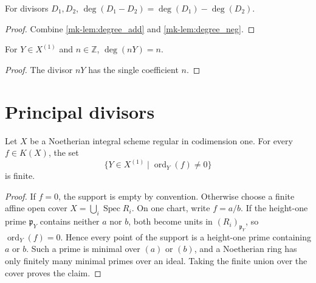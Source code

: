 \begin{lemma}
  \label{mk-lem:degree_sub}
  \leanok

  For divisors \(D_1,D_2\),
  \(\deg(D_1-D_2)=\deg(D_1)-\deg(D_2)\).
\end{lemma}
\begin{proof}
  \leanok
  Combine \ref{mk-lem:degree_add} and \ref{mk-lem:degree_neg}.
\end{proof}

\begin{lemma}
  \label{mk-lem:degree_single}
  \leanok

  For \(Y\in X^{(1)}\) and \(n\in\mathbb Z\),
  \(\deg(nY)=n\).
\end{lemma}
\begin{proof}
  \leanok
  The divisor \(nY\) has the single coefficient \(n\).
\end{proof}

\section{Principal divisors}

\begin{lemma}
  \label{mk-lem:rationalMap_order_finite_support}
  \leanok


  Let \(X\) be a Noetherian integral scheme regular in codimension one.
  For every \(f\in K(X)\), the set
  \[
    \{Y\in X^{(1)}\mid\operatorname{ord}_Y(f)\neq0\}
  \]
  is finite.
\end{lemma}
\begin{proof}
  \leanok
  If \(f=0\), the support is empty by convention.  Otherwise choose a finite
  affine open cover \(X=\bigcup_i\operatorname{Spec}R_i\).  On one chart,
  write \(f=a/b\).  If the height-one prime \(\mathfrak p_Y\) contains
  neither \(a\) nor \(b\), both become units in
  \((R_i)_{\mathfrak p_Y}\), so \(\operatorname{ord}_Y(f)=0\).
  Hence every point of the support is a height-one prime containing \(a\)
  or \(b\).  Such a prime is minimal over \((a)\) or \((b)\), and a
  Noetherian ring has only finitely many minimal primes over an ideal.
  Taking the finite union over the cover proves the claim.
\end{proof}


